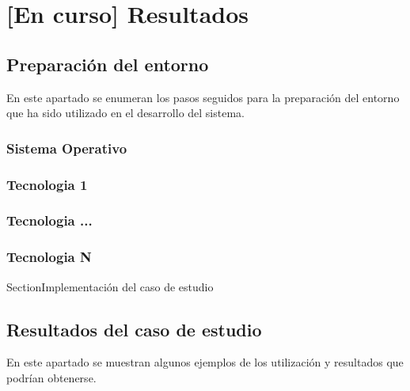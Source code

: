 \chapter{[En curso] Resultados}
\label{chapter:resultados}


\section{Preparación del entorno}
En este apartado se enumeran los pasos seguidos para la preparación del entorno que ha sido utilizado en el desarrollo del sistema.

\subsection{Sistema Operativo}


\subsection{Tecnologia 1}
\subsection{Tecnologia ...}
\subsection{Tecnologia N}

Section{Implementación del caso de estudio} \label{Implementación del caso de estudio}


\section{Resultados del caso de estudio}

En este apartado se muestran algunos ejemplos de los utilización y resultados que podrían obtenerse.


